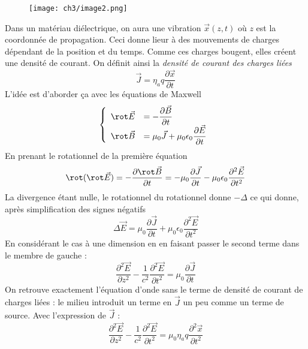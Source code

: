 \begin{wrapfigure}[6]{r}{9cm}
	\vspace{-5mm}
	\texttt{[image: ch3/image2.png]}
	\end{wrapfigure}
Dans un matériau diélectrique, on aura une vibration $\vec{x}(z,t)$ où $z$ est la coordonnée de propagation. 
Ceci donne lieur à des mouvements de charges dépendant de la position et du temps. Comme ces charges bougent, 
elles créent une densité de courant. On définit ainsi la \textit{densité de courant des charges liées}
\begin{equation}
\vec{J} = \eta_aq\dfrac{\partial \vec{x}}{\partial t}
\end{equation}
L'idée est d'aborder ça avec les équations de Maxwell
\begin{equation}
\left\{\begin{array}{ll}
\rot \vec{E} &= -\dfrac{\partial \vec{B}}{\partial t}\\
\rot \vec{B} &= \mu_0\vec{J} + \mu_0\epsilon_0\dfrac{\partial \vec{E}}{\partial t}
\end{array}\right.
\end{equation}
En prenant le rotationnel de la première équation
\begin{equation}
\rot(\rot\vec{E}) = -\dfrac{\partial \rot\vec{B}}{\partial t} = -\mu_0\dfrac{\partial \vec{J}}{\partial 
t} - \mu_0\epsilon_0\dfrac{\partial^2\vec{E}}{\partial t^2}
\end{equation}
La divergence étant nulle, le rotationnel du rotationnel donne $-\Delta$ ce qui donne, après simplification 
des signes négatifs
\begin{equation}
\Delta \vec{E} = \mu_0\dfrac{\partial\vec{J}}{\partial t}+\mu_0\epsilon_0\dfrac{\partial^2\vec{E}}{\partial 
t^2}
\end{equation}
En considérant le cas à une dimension en en faisant passer le second terme dans le membre de gauche :
\begin{equation}
\dfrac{\partial^2\vec{E}}{\partial z^2} - \dfrac{1}{c^2}\dfrac{\partial^2\vec{E}}{\partial t^2} = \mu_0 
\dfrac{\partial\vec{J}}{\partial t}
\end{equation}
On retrouve exactement l'équation d'onde sans le terme de densité de courant de charges liées : le milieu 
introduit un terme en $\vec{J}$ un peu comme un terme de source. Avec l'expression de $\vec{J}$ :
\begin{equation}
\dfrac{\partial^2\vec{E}}{\partial z^2} - \dfrac{1}{c^2}\dfrac{\partial^2\vec{E}}{\partial t^2} = \mu_0 \eta_a 
q \dfrac{\partial^2\vec{x}}{\partial t^2}
\end{equation}

